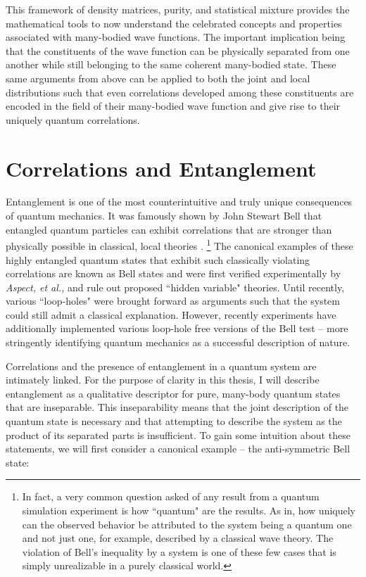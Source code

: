 This framework of density matrices, purity, and statistical mixture provides the mathematical tools to now understand the celebrated concepts and properties associated with many-bodied wave functions. The important implication being that the constituents of the wave function can be physically separated from one another while still belonging to the same coherent many-bodied state. These same arguments from above can be applied to both the joint and local distributions such that even correlations developed among these constituents are encoded in the field of their many-bodied wave function and give rise to their uniquely quantum correlations.

\section{Correlations and Entanglement}

Entanglement is one of the most counterintuitive and truly unique consequences of quantum mechanics. It was famously shown by John Stewart Bell that entangled quantum particles can exhibit correlations that are stronger than physically possible in classical, local theories \cite{Bell1964}. \footnote{In fact, a very common question asked of any result from a quantum simulation experiment is how ``quantum" are the results. As in, how uniquely can the observed behavior be attributed to the system being a quantum one and not just one, for example, described by a classical wave theory. The violation of Bell's inequality by a system is one of these few cases that is simply unrealizable in a purely classical world.} The canonical examples of these highly entangled quantum states that exhibit such classically violating correlations are known as Bell states and were first  verified experimentally by \emph{Aspect, et al.,}\cite{Aspect1981,Aspect1982} and rule out proposed ``hidden variable" theories.  Until recently, various ``loop-holes" were brought forward as arguments such that the system could still admit a classical explanation. However, recently experiments have additionally implemented various loop-hole free versions of the Bell test\cite{Hensen2015,Giustina2015,Shalm2015} -- more stringently identifying quantum mechanics as a successful description of nature. 

Correlations and the presence of entanglement in a quantum system are intimately linked. For the purpose of clarity in this thesis, I will describe entanglement as a qualitative descriptor for pure, many-body quantum states that are inseparable. This inseparability means that the joint description of the quantum state is necessary and that attempting to describe the system as the product of its separated parts is insufficient. To gain some intuition about these statements, we will first consider a canonical example -- the anti-symmetric Bell state: 

